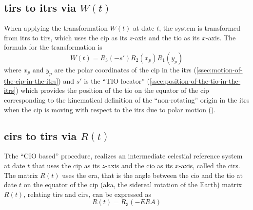 \subsection{\gls{tirs} to \gls{itrs} via \(W(t)\)}
\label{ssec:tirs-to-itrs-via-w}
When applying the transformation \(W(t)\) at date \(t\), the system is transformed 
from \gls{itrs} to \gls{tirs}, which uses the \gls{cip} as its \(z\)-axis and 
the \gls{tio} as its \(x\)-axis. The formula for the transformation is
\begin{equation}
  \label{eq:tn3653}
  W(t) = R_3 (-s') R_2 (x_p ) R_1 (y_p )
\end{equation}
where \(x_p\) and \(y_p\) are the polar coordinates of the \gls{cip} in the 
\gls{itrs} (\ref{ssec:motion-of-the-cip-in-the-itrs}) and \(s'\) is the 
``TIO locator'' (\ref{ssec:position-of-the-tio-in-the-itrs}) which provides 
the position of the \gls{tio} on the equator of the \gls{cip} corresponding to 
the kinematical definition of the ``non-rotating'' origin in the \gls{itrs} 
when the \gls{cip} is moving with respect to the \gls{itrs} due to polar motion 
(\cite{iers2010}).

\subsection{\gls{cirs} to \gls{tirs} via \(R(t)\)}
\label{ssec:cirs-to-tirs-via-r}
Tthe ``CIO based'' procedure, realizes an intermediate celestial reference system 
at date \(t\) that uses the \gls{cip} as its \(z\)-axis and the \gls{cio} as its 
\(x\)-axis, called the \gls{cirs}. The matrix \(R(t)\) uses the \gls{era}, that 
is the angle between the \gls{cio} and the \gls{tio} at date \(t\) on the equator 
of the \gls{cip} (aka, the sidereal rotation of the Earth) matrix \(R(t)\), relating 
\gls{tirs} and \gls{cirs}, can be expressed as
\begin{equation}
  \label{eq:tn3655}
  R(t) = R_3 (-ERA)
\end{equation}


